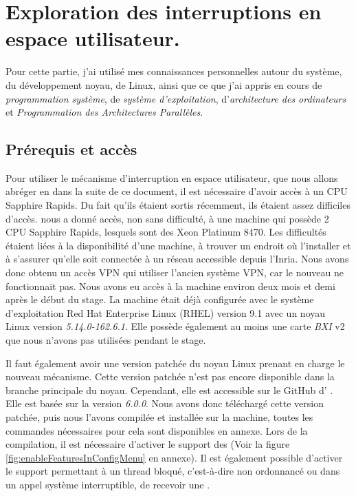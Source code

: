 \section{Exploration des interruptions en espace utilisateur.}
\label{sec:exploreUintr}

Pour cette partie, j'ai utilisé mes connaissances personnelles autour du système, du développement noyau, de Linux, ainsi que ce que j'ai appris en cours de \emph{programmation système}, de \emph{système d'exploitation}, d'\emph{architecture des ordinateurs} et \emph{Programmation des Architectures Parallèles}.

\subsection{Prérequis et accès}
\label{requirements}

Pour utiliser le mécanisme d'interruption en espace utilisateur, que nous allons abréger en \uintr{} dans la suite de ce document,
il est nécessaire d'avoir accès à un CPU \intel{} Sapphire Rapids.
Du fait qu'ils étaient sortis récemment, ils étaient assez difficiles d'accès.
\atos{} nous a donné accès, non sans difficulté, à une machine qui possède 2 CPU \intel{} Sapphire Rapids, lesquels sont des \intel{} Xeon\textsuperscript{\tiny{\textregistered}} Platinum 8470.
Les difficultés étaient liées à la disponibilité d'une machine, à trouver un endroit où l'installer et à s'assurer qu'elle soit connectée à un réseau accessible depuis l'Inria.
Nous avons donc obtenu un accès VPN qui utiliser l'ancien système VPN, car le nouveau ne fonctionnait pas.
Nous avons eu accès à la machine environ deux mois et demi après le début du stage.
La machine était déjà configurée avec le système d'exploitation Red Hat Enterprise Linux (RHEL) version 9.1 avec un noyau Linux version \emph{5.14.0-162.6.1}.
Elle possède également au moins une carte \emph{BXI} v2 que nous n'avons pas utilisées pendant le stage. %

Il faut également avoir une version patchée du noyau Linux prenant en charge le nouveau mécanisme.
Cette version patchée n'est pas encore disponible dans la branche principale du noyau.
Cependant, elle est accessible sur le GitHub d'\intel{} \cite{intelUintrLinuxKernel}.
Elle est basée sur la version \emph{6.0.0}.
Nous avons donc téléchargé cette version patchée, puis nous l'avons compilée et installée sur la machine, toutes les commandes nécessaires pour cela sont disponibles en annexe.
Lors de la compilation, il est nécessaire d'activer le support des \uintr{} (Voir la figure \ref{fig:enableFeaturesInConfigMenu} en annexe).
Il est également possible d'activer le support permettant à un thread bloqué, c'est-à-dire non ordonnancé ou dans un appel système interruptible, de recevoir une \uintr{}.

